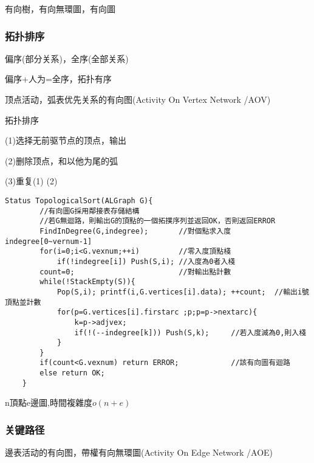 \documentclass[UTF8]{ctexart}
\newcommand{\q}{\quad}
\begin{document}
有向樹，有向無環圖，有向圖











\subsubsection{拓扑排序}

偏序(部分关系)，全序(全部关系)

偏序+人为=全序，拓扑有序

顶点活动，弧表优先关系的有向图(Activity On Vertex Network /AOV)







拓扑排序

    \q (1)选择无前驱节点的顶点，输出

    \q (2)删除顶点，和以他为尾的弧

    \q (3)重复(1) (2)

    


\begin{lstlisting}[style=v1]
    Status TopologicalSort(ALGraph G){
        //有向圖G採用鄰接表存儲結構
        //若G無迴路，則輸出G的頂點的一個拓撲序列並返回OK，否則返回ERROR
        FindInDegree(G,indegree);       //對個點求入度 indegree[0~vernum-1]
        for(i=0;i<G.vexnum;++i)         //零入度頂點棧
            if(!indegree[i]) Push(S,i); //入度為0者入棧
        count=0;                        //對輸出點計數
        while(!StackEmpty(S)){
            Pop(S,i); printf(i,G.vertices[i].data); ++count;  //輸出i號頂點並計數
            for(p=G.vertices[i].firstarc ;p;p=p->nextarc){
                k=p->adjvex;
                if(!(--indegree[k])) Push(S,k);     //若入度減為0,則入棧
            }   
        }    
        if(count<G.vexnum) return ERROR;            //該有向圖有迴路
        else return OK;
    }
\end{lstlisting}

n頂點e邊圖,時間複雜度$o(n+e)$


\newpage

\subsubsection{关键路径}

邊表活动的有向图，帶權有向無環圖(Activity On Edge Network /AOE)
\end{document}
